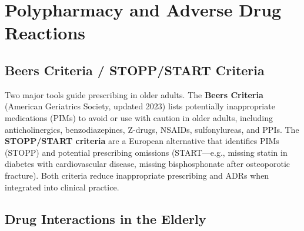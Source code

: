 \section{Polypharmacy and Adverse Drug Reactions}








\label{sec:Polypharmacy and Adverse Drug Reactions}

\subsection{Beers Criteria / STOPP/START Criteria}
\label{sec:Beers Criteria / STOPP/START Criteria}

Two major tools guide prescribing in older adults. The \textbf{Beers Criteria} (American Geriatrics Society, updated 2023) lists potentially inappropriate medications (PIMs) to avoid or use with caution in older adults, including anticholinergics, benzodiazepines, Z-drugs, NSAIDs, sulfonylureas, and PPIs. The \textbf{STOPP/START criteria} are a European alternative that identifies PIMs (STOPP) and potential prescribing omissions (START---e.g., missing statin in diabetes with cardiovascular disease, missing bisphosphonate after osteoporotic fracture). Both criteria reduce inappropriate prescribing and ADRs when integrated into clinical practice.

\subsection{Drug Interactions in the Elderly}
\label{sec:Drug Interactions in the Elderly}


